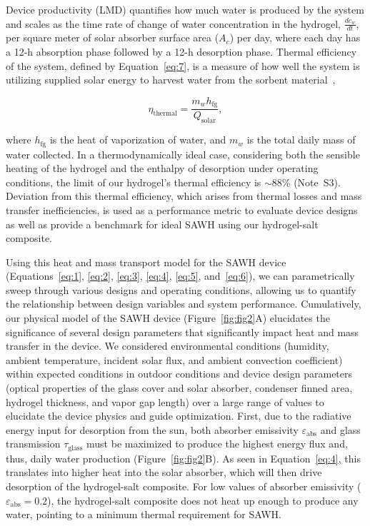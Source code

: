 \documentclass[11pt]{article}
\begin{document}
Device productivity (LMD) quantifies how much water is produced by the system and scales as the time rate of change of water concentration in the hydrogel, $\frac{dc_w}{dt}$, per square meter of solar absorber surface area ($A_c$) per day, where each day has a 12-h absorption phase followed by a 12-h desorption phase. Thermal efficiency of the system, defined by Equation~\ref{eq:7}, is a measure of how well the system is utilizing supplied solar energy to harvest water from the sorbent material~\cite{wilson2023},

\begin{equation}
\eta_{\mathrm{thermal}} = \frac{m_w h_{\mathrm{fg}}}{Q_{\mathrm{solar}}},
\label{eq:7}
\end{equation}

\noindent where $h_{\mathrm{fg}}$ is the heat of vaporization of water, and $m_w$ is the total daily mass of water collected. In a thermodynamically ideal case, considering both the sensible heating of the hydrogel and the enthalpy of desorption under operating conditions, the limit of our hydrogel's thermal efficiency is $\sim$88\% (Note~S3). Deviation from this thermal efficiency, which arises from thermal losses and mass transfer inefficiencies, is used as a performance metric to evaluate device designs as well as provide a benchmark for ideal SAWH using our hydrogel-salt composite.

Using this heat and mass transport model for the SAWH device (Equations~\ref{eq:1}, \ref{eq:2}, \ref{eq:3}, \ref{eq:4}, \ref{eq:5}, and~\ref{eq:6}), we can parametrically sweep through various designs and operating conditions, allowing us to quantify the relationship between design variables and system performance. Cumulatively, our physical model of the SAWH device (Figure~\ref{fig:fig2}A) elucidates the significance of several design parameters that significantly impact heat and mass transfer in the device. We considered environmental conditions (humidity, ambient temperature, incident solar flux, and ambient convection coefficient) within expected conditions in outdoor conditions and device design parameters (optical properties of the glass cover and solar absorber, condenser finned area, hydrogel thickness, and vapor gap length) over a large range of values to elucidate the device physics and guide optimization. First, due to the radiative energy input for desorption from the sun, both absorber emissivity $\varepsilon_{\mathrm{abs}}$ and glass transmission $\tau_{\mathrm{glass}}$ must be maximized to produce the highest energy flux and, thus, daily water production (Figure~\ref{fig:fig2}B). As seen in Equation~\ref{eq:4}, this translates into higher heat into the solar absorber, which will then drive desorption of the hydrogel-salt composite. For low values of absorber emissivity ($\varepsilon_{\mathrm{abs}} = 0.2$), the hydrogel-salt composite does not heat up enough to produce any water, pointing to a minimum thermal requirement for SAWH.
\end{document}
